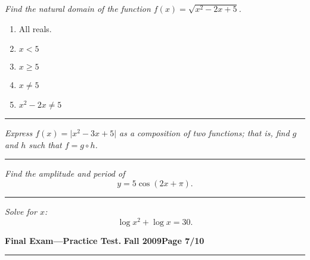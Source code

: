 \documentclass[12pt]{article}
\begin{document}
\bigskip
{\problem[10 pts] \em  Find the natural domain of the function $f(x) = \sqrt{x^2-2x+5}$.}
\begin{enumerate}
\item All reals.
\item $x < 5$
\item $x \geq 5$
\item $x \neq 5$
\item $x^2-2x \neq 5$
\end{enumerate}
\vspace{1cm}
\hrule
{\problem[10pts] \em Express $f(x) = \lvert x^2-3x+5 \rvert$ as a composition of two functions; that is, find $g$ and $h$ such that $f= g \circ h$.}
\vspace{1cm}
\begin{flushright}
\end{flushright}
\hrule
{\problem[10pts] \em Find the amplitude and period of}
\begin{equation*}
y = 5 \cos( 2x + \pi).
\end{equation*}
\vspace{0.5cm}
\begin{flushright}
\end{flushright}
\hrule
{\problem[10 pts] \em Solve for $x$:}
\begin{equation*}
\log x^2 + \log x = 30.
\end{equation*}
\vspace{2cm}
\begin{flushright}
\end{flushright}
\newpage

\hfill{\large\bf Final Exam---Practice Test.}\hfill{\large\bf
  Fall 2009}\hfill{\large\bf Page 7/10}\hrule
  
\end{document}

